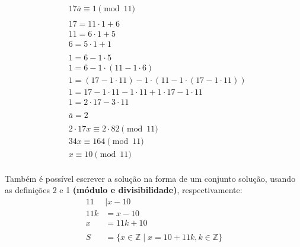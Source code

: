 \begin{align*}
     & 17\overline{a} \equiv 1 \pmod{11}                                \\
    \\
     & 17 = 11 \cdot 1 + 6                                              \\
     & 11 = 6 \cdot 1 + 5                                               \\
     & 6 = 5 \cdot 1 + 1                                                \\
    \\
     & 1 = 6 - 1 \cdot 5                                                \\
     & 1 = 6 - 1 \cdot (11 - 1 \cdot 6)                                 \\
     & 1 = (17 - 1 \cdot 11) - 1 \cdot (11 - 1 \cdot (17 - 1 \cdot 11)) \\
     & 1 = 17 - 1 \cdot 11 - 1 \cdot 11 + 1 \cdot 17 -1 \cdot 11        \\
     & 1 = 2 \cdot 17 - 3 \cdot 11                                      \\
    \\
     & \overline{a} = 2                                                 \\
    \\
     & 2 \cdot 17x \equiv 2 \cdot 82 \pmod {11}                         \\
     & 34x \equiv 164 \pmod {11}                                        \\
     & \boxed{x \equiv 10 \pmod {11}}                                   \\
\end{align*}

Também é possível escrever a solução na forma de um conjunto solução, usando as definições 2 e 1 \textbf{(módulo e divisibilidade)}, respectivamente:
\begin{align*}
    11  & \mid x - 10                                                \\
    11k & = x - 10                                                   \\
    x   & = 11k + 10                                                 \\
    \\
    S   & = \{x \in \mathbb{Z} \mid x = 10 + 11k, k \in \mathbb{Z}\}
\end{align*}